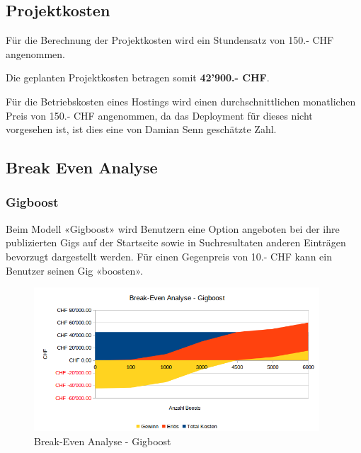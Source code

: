 \subsection{Projektkosten}

Für die Berechnung der Projektkosten wird ein Stundensatz von 150.- CHF angenommen.



\noindent
Die geplanten Projektkosten betragen somit \textbf{42'900.- CHF}.



Für die Betriebskosten eines Hostings wird einen durchschnittlichen monatlichen
Preis von 150.- CHF angenommen, da das Deployment für dieses nicht vorgesehen
ist, ist dies eine von Damian Senn geschätzte Zahl.

\clearpage
\subsection{Break Even Analyse}\label{break-even-analyse}

\subsubsection{Gigboost}

Beim Modell «Gigboost» wird Benutzern eine Option angeboten bei der ihre
publizierten Gigs auf der Startseite sowie in Suchresultaten anderen Einträgen
bevorzugt dargestellt werden. Für einen Gegenpreis von 10.- CHF kann ein Benutzer
seinen Gig «boosten».

\begin{figure}[!htb]
  \centering
  \includegraphics[width=0.95\textwidth]{initialisierung/wirtschaftlichkeit-gigboost.png}
  \caption{Break-Even Analyse - Gigboost}
\end{figure}

\clearpage
